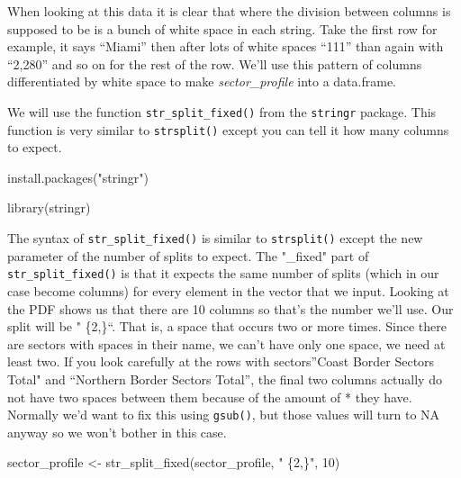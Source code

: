 \documentclass[
]{krantz}
\makeatletter
\newenvironment{Shaded}{\begin{snugshade}}{\end{snugshade}}
\newcommand{\DecValTok}[1]{\textcolor[rgb]{0.06,0.06,0.06}{#1}}
\newcommand{\FunctionTok}[1]{\textcolor[rgb]{0,0,0}{#1}}
\newcommand{\NormalTok}[1]{#1}
\newcommand{\OtherTok}[1]{\textcolor[rgb]{0.37,0.37,0.37}{#1}}
\newcommand{\StringTok}[1]{\textcolor[rgb]{0.5,0.5,0.5}{#1}}
\newenvironment{kframe}{%
\medskip{}
\setlength{\fboxsep}{.8em}
 \def\at@end@of@kframe{}%
 \ifinner\ifhmode%
  \def\at@end@of@kframe{\end{minipage}}%
  \begin{minipage}{\columnwidth}%
 \fi\fi%
 \def\FrameCommand##1{\hskip\@totalleftmargin \hskip-\fboxsep
 \colorbox{shadecolor}{##1}\hskip-\fboxsep
     \hskip-\linewidth \hskip-\@totalleftmargin \hskip\columnwidth}%
 \MakeFramed {\advance\hsize-\width
   \@totalleftmargin\z@ \linewidth\hsize
   \@setminipage}}%
 {\par\unskip\endMakeFramed%
 \at@end@of@kframe}
\renewenvironment{Shaded}{\begin{kframe}}{\end{kframe}}
\makeatother
\begin{document}
When looking at this data it is clear that where the division between columns is supposed to be is a bunch of white space in each string. Take the first row for example, it says ``Miami'' then after lots of white spaces ``111'' than again with ``2,280'' and so on for the rest of the row. We'll use this pattern of columns differentiated by white space to make \emph{sector\_profile} into a data.frame.

We will use the function \texttt{str\_split\_fixed()} from the \texttt{stringr} package. This function is very similar to \texttt{strsplit()} except you can tell it how many columns to expect.

\begin{Shaded}
\begin{Highlighting}[]
\FunctionTok{install.packages}\NormalTok{(}\StringTok{"stringr"}\NormalTok{)}
\end{Highlighting}
\end{Shaded}

\begin{Shaded}
\begin{Highlighting}[]
\FunctionTok{library}\NormalTok{(stringr)}
\end{Highlighting}
\end{Shaded}

The syntax of \texttt{str\_split\_fixed()} is similar to \texttt{strsplit()} except the new parameter of the number of splits to expect. The "\_fixed" part of \texttt{str\_split\_fixed()} is that it expects the same number of splits (which in our case become columns) for every element in the vector that we input. Looking at the PDF shows us that there are 10 columns so that's the number we'll use. Our split will be " \{2,\}``. That is, a space that occurs two or more times. Since there are sectors with spaces in their name, we can't have only one space, we need at least two. If you look carefully at the rows with sectors''Coast Border Sectors Total" and ``Northern Border Sectors Total'', the final two columns actually do not have two spaces between them because of the amount of * they have. Normally we'd want to fix this using \texttt{gsub()}, but those values will turn to NA anyway so we won't bother in this case.

\begin{Shaded}
\begin{Highlighting}[]
\NormalTok{sector\_profile }\OtherTok{\textless{}{-}} \FunctionTok{str\_split\_fixed}\NormalTok{(sector\_profile, }\StringTok{" \{2,\}"}\NormalTok{, }\DecValTok{10}\NormalTok{)}
\end{Highlighting}
\end{Shaded}
\end{document}
